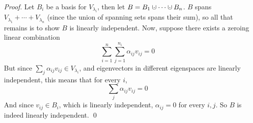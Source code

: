 \begin{proof}

    Let $B_i$ be a basis for $V_{\lambda_i}$, then let $B=B_1\dcup\cdots\dcup B_n$.
    $B$ spans $V_{\lambda_1}+\cdots+V_{\lambda_n}$ (since the union of spanning sets spans their sum), so all that remains is to show $B$ is linearly independent.
    Now, suppose there exists a zeroing linear combination
    \[ \sum_{i=1}^n\sum_{j=1}^{n_i}\alpha_{ij}v_{ij} = 0 \]
    But since $\sum_j\alpha_{ij}v_{ij}\in V_{\lambda_i}$, and eigenvectors in different eigenspaces are linearly independent, this means that for every $i$,
    \[ \sum_j\alpha_{ij}v_{ij} = 0 \]
    And since $v_{ij}\in B_i$, which is linearly independent, $\alpha_{ij}=0$ for every $i,j$.
    So $B$ is indeed linearly independent.
    \qed

\end{proof}

